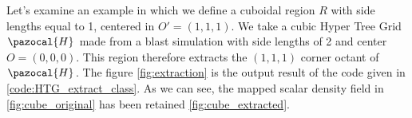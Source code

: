\documentclass[
	a4paper,
	12pt,
	raggedright,
	twoside
]{tufte-style-article}
\theoremstyle{definition}
\theoremstyle{remark}
\begin{document}
Let's examine an example in which we define a cuboidal region $R$ with side lengths equal to 1, centered in $O' = (1, 1, 1)$. We take a cubic Hyper Tree Grid $\pazocal{H}$ made from a blast simulation with side lengths of 2 and center $O = (0, 0, 0)$. This region therefore extracts the $(1,1,1)$ corner octant of  $\pazocal{H}$. The figure \ref{fig:extraction} is the output result of the code given in \ref{code:HTG_extract_class}. As we can see, the mapped scalar density field in \ref{fig:cube_original} has been retained \ref{fig:cube_extracted}.

\begin{figure}[h!]
    \centering
\end{figure}
\end{document}
